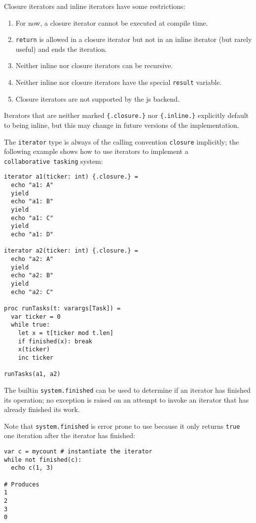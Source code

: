 Closure iterators and inline iterators have some restrictions:

\begin{enumerate}
\def\labelenumi{\arabic{enumi}.}
\tightlist
\item
  For now, a closure iterator cannot be executed at compile time.
\item
  \texttt{return} is allowed in a closure iterator but not in an inline
  iterator (but rarely useful) and ends the iteration.
\item
  Neither inline nor closure iterators can be recursive.
\item
  Neither inline nor closure iterators have the special \texttt{result}
  variable.
\item
  Closure iterators are not supported by the js backend.
\end{enumerate}

Iterators that are neither marked \texttt{\{.closure.\}} nor
\texttt{\{.inline.\}} explicitly default to being inline, but this may
change in future versions of the implementation.

The \texttt{iterator} type is always of the calling convention
\texttt{closure} implicitly; the following example shows how to use
iterators to implement a \texttt{collaborative\ tasking} system:

\begin{verbatim}
iterator a1(ticker: int) {.closure.} =
  echo "a1: A"
  yield
  echo "a1: B"
  yield
  echo "a1: C"
  yield
  echo "a1: D"

iterator a2(ticker: int) {.closure.} =
  echo "a2: A"
  yield
  echo "a2: B"
  yield
  echo "a2: C"

proc runTasks(t: varargs[Task]) =
  var ticker = 0
  while true:
    let x = t[ticker mod t.len]
    if finished(x): break
    x(ticker)
    inc ticker

runTasks(a1, a2)
\end{verbatim}

The builtin \texttt{system.finished} can be used to determine if an
iterator has finished its operation; no exception is raised on an
attempt to invoke an iterator that has already finished its work.

Note that \texttt{system.finished} is error prone to use because it only
returns \texttt{true} one iteration after the iterator has finished:

\begin{verbatim}
var c = mycount # instantiate the iterator
while not finished(c):
  echo c(1, 3)

# Produces
1
2
3
0
\end{verbatim}

